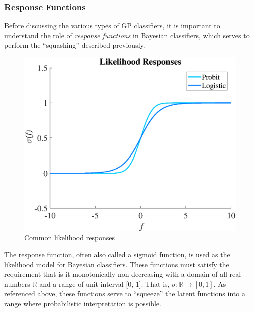 			\subsubsection{Response Functions}
			\label{BenthicHabitatMapping:Classification:ResponseFunction}
			
				Before discussing the various types of GP classifiers, it is important to understand the role of \textit{response functions} in Bayesian classifiers, which serves to perform the ``squashing'' described previously.
	
				\begin{figure}
					\centering
						\includegraphics[width=\linewidth]{Figures/responses.eps}
					\caption{Common likelihood responses}
					\label{Figure:LikelihoodResponses}
				\end{figure}
						
				The response function, often also called a sigmoid function, is used as the likelihood model for Bayesian classifiers. These functions must satisfy the requirement that is it monotonically non-decreasing with a domain of all real numbers $\mathbb{R}$ and a range of unit interval [0, 1]. That is, $\sigma: \mathbb{R} \mapsto [0, 1]$. As referenced above, these functions serve to ``squeeze'' the latent functions into a range where probabilistic interpretation is possible.
					
